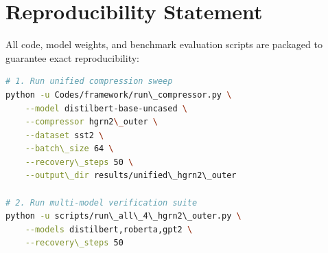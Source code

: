 \section{Reproducibility Statement}
All code, model weights, and benchmark evaluation scripts are packaged to guarantee exact reproducibility:
\begin{lstlisting}[language=bash]
# 1. Run unified compression sweep
python -u Codes/framework/run\_compressor.py \
    --model distilbert-base-uncased \
    --compressor hgrn2\_outer \
    --dataset sst2 \
    --batch\_size 64 \
    --recovery\_steps 50 \
    --output\_dir results/unified\_hgrn2\_outer

# 2. Run multi-model verification suite
python -u scripts/run\_all\_4\_hgrn2\_outer.py \
    --models distilbert,roberta,gpt2 \
    --recovery\_steps 50
\end{lstlisting}
